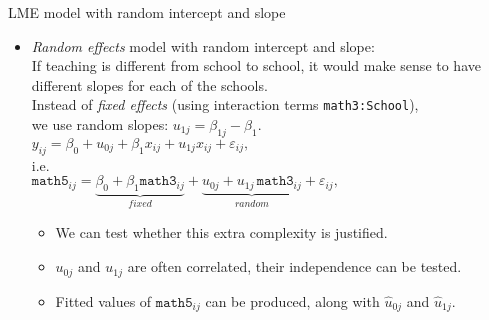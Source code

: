 \documentclass{beamer}
\begin{document}
\begin{frame}{LME model with random intercept and slope}
\begin{itemize}
\item \textit{Random effects} model with random intercept and slope:\\
\medskip
If teaching is different from school to school, it would make
sense to have different slopes for each of the schools.\\
\medskip
Instead of \textit{fixed effects} (using interaction terms \texttt{math3:School}), \\we use random slopes: $ u_{1j} = \beta_{1j} - \beta_1 $. \\
\medskip
$ y_{ij} = \beta_{0} + u_{0j} + \beta_1 x_{ij}  + u_{1j} x_{ij}+ \varepsilon_{ij}, $ \\
\medskip
i.e.\\
\medskip
$\texttt{math5}_{ij} = \underbrace{\beta_{0} + \beta_1 \texttt{math3}_{ij}}_{\textit{fixed}}
+ \underbrace{u_{0j} + u_{1j}\, \texttt{math3}_{ij}}_{\textit{random}} 
+ \varepsilon_{ij}, $ \\
\medskip
\begin{itemize}
\item We can test whether this extra complexity is justified.
\smallskip
\item ${u}_{0j}$ and ${u}_{1j}$ are often correlated, their independence can be tested.
\smallskip
\item Fitted values of $\texttt{math5}_{ij}$ can be produced, along with $\hat{u}_{0j}$ and $\hat{u}_{1j}$.
\end{itemize}
\end{itemize}
\end{frame}
\end{document}
